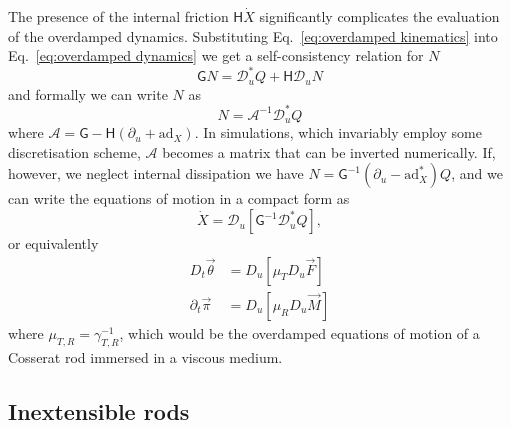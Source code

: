 The presence of the internal friction $\mathsf{H} \dot{X}$ significantly complicates the evaluation of the overdamped dynamics. Substituting Eq.~\ref{eq:overdamped kinematics} into Eq.~\ref{eq:overdamped dynamics} we get a self-consistency relation for $N$
\begin{equation}
\mathsf{G} N = \mathcal{D}^*_u Q + \mathsf{H} \mathcal{D}_u N
\end{equation}
and formally we can write $N$ as
\begin{equation}
N = \mathscr{A}^{-1} \mathcal{D}^*_u Q
\end{equation}
where $\mathscr{A} = \mathsf{G} - \mathsf{H} (\partial_u + \text{ad}_X)$. In simulations, which invariably employ some discretisation scheme, $\mathscr{A}$ becomes a matrix that can be inverted numerically. If, however, we neglect internal dissipation we have $N = \mathsf{G}^{-1} \left( \partial_u - \text{ad}_X^* \right) Q$, and we can write the equations of motion in a compact form as
\begin{equation} \label{eq:Cosserat rod overdamped dynamics}
\dot{X}  = \mathcal{D}_u \left[ \mathsf{G}^{-1} \mathcal{D}^*_u Q \right],
\end{equation}
or equivalently
\begin{subequations} 
\begin{align}
D_t \vec{\theta} & = D_u \left[ \mu_T D_u \vec{F} \right] \label{eq:overdamped cosserat rod theta eom} \\
\partial_t \vec{\pi} & = D_u \left[ \mu_R  D_u \vec{M} \right] 
\end{align}
\end{subequations}
where $\mu_{T,R} = \gamma_{T,R}^{-1}$, which would be the overdamped equations of motion of a Cosserat rod immersed in a viscous medium. 

\subsection{Inextensible rods}

